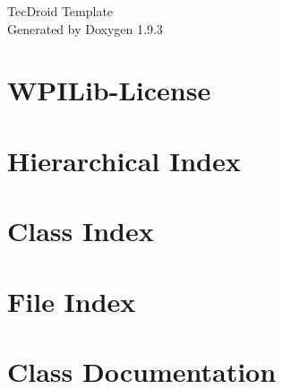 \documentclass[twoside]{book}
\newcommand{\+}{\discretionary{\mbox{\scriptsize$\hookleftarrow$}}{}{}}
\newcommand{\clearemptydoublepage}{%
    \newpage{\pagestyle{empty}\cleardoublepage}%
  }
\begin{document}
  \raggedbottom
    \hypersetup{pageanchor=false,
                bookmarksnumbered=true,
                pdfencoding=unicode
               }
  \begin{titlepage}
  \vspace*{7cm}
  \begin{center}%
  {\Large Tec\+Droid Template}\\
  \vspace*{1cm}
  {\large Generated by Doxygen 1.9.3}\\
  \end{center}
  \end{titlepage}
  \clearemptydoublepage
  \tableofcontents
  \clearemptydoublepage
  \hypersetup{pageanchor=true}
\chapter{WPILib-\/\+License}
\label{md__w_p_i_lib__license}

\chapter{Hierarchical Index}

\chapter{Class Index}

\chapter{File Index}

\chapter{Class Documentation}















\end{document}
